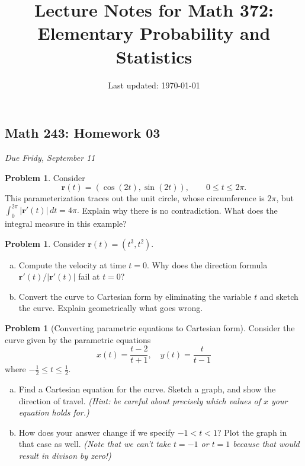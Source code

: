 \documentclass[10pt]{article}
\title{Lecture Notes for Math 372: \\Elementary Probability and Statistics}
\date{Last updated: \today}
\theoremstyle{definition}
\newtheorem{problem}[theorem]{Problem}
\newcommand{\1}[1]{\textbf{1}_{\left[#1\right]}} %
\begin{document}
\begin{center}
  \section*{Math 243: Homework 03}
  \textit{Due Fridy, September 11}
\end{center}


\begin{problem}
  Consider
  \[
    \mathbf r(t)=(\cos(2t),\sin(2t)),
    \qquad 0\leq t\leq2\pi.
  \]
  This parameterization traces out the unit circle, whose circumference is
  $2\pi$, but $\int_0^{2\pi}|\mathbf r'(t)|\,dt=4\pi.$
  Explain why there is no contradiction. What does the integral measure in
  this example?
\end{problem}

\begin{problem}
  Consider $\mathbf r(t)=(t^{3},t^{2})$.
  \begin{enumerate}[(a)]
    \item Compute the velocity at time $t=0$. Why does the direction formula
    $\mathbf r'(t)/\left|\mathbf r'(t)\right|$ fail at $t=0$?

    \item Convert the curve to Cartesian form by eliminating the variable $t$
    and sketch the curve. Explain geometrically what goes wrong.
  \end{enumerate}
\end{problem}

\begin{problem}[Converting parametric equations to Cartesian form]
  Consider the curve given by the parametric equations
  \begin{equation*}
    x(t) = \frac{t-2}{t+1}, \quad y(t) = \frac{t}{t-1}
  \end{equation*}
  where  $-\frac{1}{2}\leq t \leq \frac{1}{2}$. 

  \begin{enumerate}[(a)]
    \item Find a Cartesian equation for the curve. Sketch a graph, and
    show the direction of travel. \textit{(Hint: be careful about precisely which values of $x$ your equation
    holds for.)}
    \item How does your answer change if we specify $-1<t<1$? Plot the graph in that case as well. \textit{(Note
    that we can't take $t=-1$ or $t=1$ because that would result in divison by zero!)}
\end{enumerate}

\end{problem}
\end{document}

